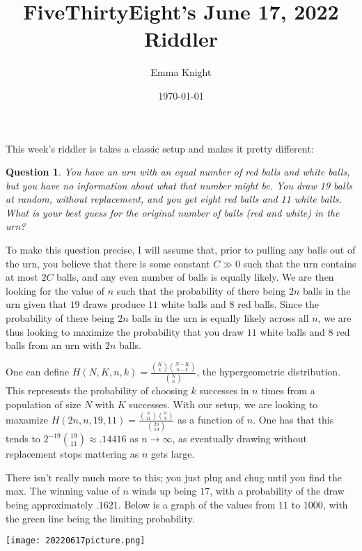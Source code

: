 \documentclass[11pt]{article}
\title{FiveThirtyEight's June 17, 2022 Riddler}
\author{Emma Knight}
\date{\today}
\newtheorem{question}[theorem]{Question}
\theoremstyle{definition}
\begin{document}
\maketitle
This week's riddler is takes a classic setup and makes it pretty different:
\begin{question}
You have an urn with an equal number of red balls and white balls, but you have no information about what that number might be. You draw 19 balls at random, without replacement, and you get eight red balls and 11 white balls. What is your best guess for the original number of balls (red and white) in the urn?
\end{question}
To make this question precise, I will assume that, prior to pulling any balls out of the urn, you believe that there is some constant $C \gg 0$ such that the urn contains at most $2C$ balls, and any even number of balls is equally likely.  We are then looking for the value of $n$ such that the probability of there being $2n$ balls in the urn given that $19$ draws produce $11$ white balls and $8$ red balls.  Since the probability of there being $2n$ balls in the urn is equally likely across all $n$, we are thus looking to maximize the probability that you draw $11$ white balls and $8$ red balls from an urn with $2n$ balls.

One can define $H(N, K, n, k) = \displaystyle{\frac{\binom{K}{k}\binom{N-K}{n-k}}{\binom{N}{n}}}$, the hypergeometric distribution.  This represents the probability of choosing $k$ successes in $n$ times from a population of size $N$ with $K$ successes.  With our setup, we are looking to maxamize $H(2n, n, 19, 11) = \displaystyle{\frac{\binom{n}{11}\binom{n}{8}}{\binom{2n}{19}}}$ as a function of $n$.  One has that this tends to $2^{-19}\binom{19}{11} \approx .14416$ as $n \rightarrow \infty$, as eventually drawing without replacement stops mattering as $n$ gets large.

There isn't really much more to this; you just plug and chug until you find the max.  The winning value of $n$ winds up being $17$, with a probability of the draw being approximately $.1621$.  Below is a graph of the values from $11$ to $1000$, with the green line being the limiting probability.

\texttt{[image: 20220617picture.png]}
\end{document}
